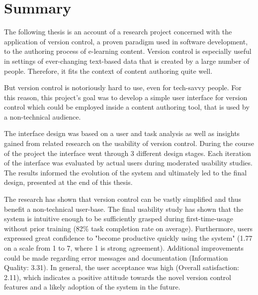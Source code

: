 \chapter{Summary}
\pagestyle{headings}

The following thesis is an account of a research project concerned with the application of version control, a proven paradigm used in software development, to the authoring process of e-learning content. Version control is especially useful in settings of ever-changing text-based data that is created by a large number of people. Therefore, it fits the context of content authoring quite well.

But version control is notoriously hard to use, even for tech-savvy people. For this reason, this project's goal was to develop a simple user interface for version control which could be employed inside a content authoring tool, that is used by a non-technical audience.

The interface design was based on a user and task analysis as well as insights gained from related research on the usability of version control. During the course of the project the interface went through 3 different design stages. Each iteration of the interface was evaluated by actual users during moderated usability studies. The results informed the evolution of the system and ultimately led to the final design, presented at the end of this thesis.

The research has shown that version control can be vastly simplified and thus benefit a non-technical user-base. The final usability study has shown that the system is intuitive enough to be sufficiently grasped during first-time-usage without prior training (82\% task completion rate on average). Furthermore, users expressed great confidence to "become productive quickly using the system" (1.77 on a scale from 1 to 7, where 1 is strong agreement). Additional improvements could be made regarding error messages and documentation (Information Quality: 3.31). In general, the user acceptance was high (Overall satisfaction: 2.11), which indicates a positive attitude towards the novel version control features and a likely adoption of the system in the future.

